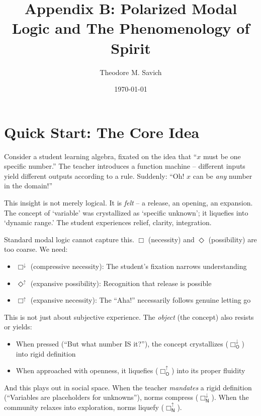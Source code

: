 \documentclass[12pt]{book}
\title{Appendix B: Polarized Modal Logic and The Phenomenology of Spirit}
\author{Theodore M. Savich}
\date{\today}
\begin{document}
\maketitle

\section*{Quick Start: The Core Idea}

Consider a student learning algebra, fixated on the idea that ``$x$ must be one specific number.'' The teacher introduces a function machine -- different inputs yield different outputs according to a rule. Suddenly: ``Oh! $x$ can be \textit{any} number in the domain!''

This insight is not merely logical. It is \textit{felt} -- a release, an opening, an expansion. The concept of `variable' was crystallized as `specific unknown'; it liquefies into `dynamic range.' The student experiences relief, clarity, integration.

Standard modal logic cannot capture this. $\Box$ (necessity) and $\Diamond$ (possibility) are too coarse. We need:
\begin{itemize}
\item $\Box^{\downarrow}$ (compressive necessity): The student's fixation narrows understanding
\item $\Diamond^{\uparrow}$ (expansive possibility): Recognition that release is possible
\item $\Box^{\uparrow}$ (expansive necessity): The ``Aha!'' necessarily follows genuine letting go
\end{itemize}

This is not just about subjective experience. The \textit{object} (the concept) also resists or yields:
\begin{itemize}
\item When pressed (``But what number IS it?''), the concept crystallizes ($\Box_{\mathsf{O}}^{\downarrow}$) into rigid definition
\item When approached with openness, it liquefies ($\Box_{\mathsf{O}}^{\uparrow}$) into its proper fluidity
\end{itemize}

And this plays out in social space. When the teacher \textit{mandates} a rigid definition (``Variables are placeholders for unknowns''), norms compress ($\Box_{\mathsf{N}}^{\downarrow}$). When the community relaxes into exploration, norms liquefy ($\Box_{\mathsf{N}}^{\uparrow}$).
\end{document}
